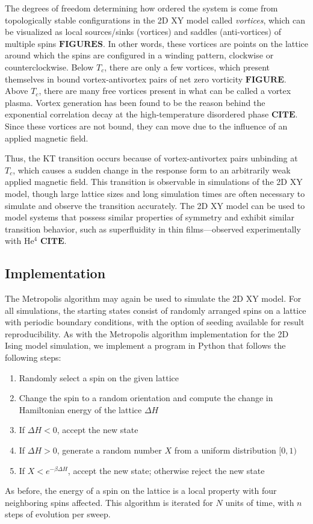 \documentclass[twocolumn,aps,prl]{revtex4-1} %
\begin{document}
The degrees of freedom determining how ordered the system is come from topologically stable configurations in the 2D XY model called \textit{vortices}, which can be visualized as local sources/sinks (vortices) and saddles (anti-vortices) of multiple spins $\textbf{FIGURES}$. In other words, these vortices are points on the lattice around which the spins are configured in a winding pattern, clockwise or counterclockwise. Below $T_c$, there are only a few vortices, which present themselves in bound vortex-antivortex pairs of net zero vorticity $\textbf{FIGURE}$. Above $T_c$, there are many free vortices present in what can be called a vortex plasma. Vortex generation has been found to be the reason behind the exponential correlation decay at the high-temperature disordered phase $\textbf{CITE}$. Since these vortices are not bound, they can move due to the influence of an applied magnetic field. 

Thus, the KT transition occurs because of vortex-antivortex pairs unbinding at $T_c$, which causes a sudden change in the response form to an arbitrarily weak applied magnetic field. This transition is observable in simulations of the 2D XY model, though large lattice sizes and long simulation times are often necessary to simulate and observe the transition accurately. The 2D XY model can be used to model systems that possess similar properties of symmetry and exhibit similar transition behavior, such as superfluidity in thin films---observed experimentally with He$^4$ $\textbf{CITE}$.

\subsection{Implementation}
The Metropolis algorithm may again be used to simulate the 2D XY model. For all simulations, the starting states consist of randomly arranged spins on a lattice with periodic boundary conditions, with the option of seeding available for result reproducibility. As with the Metropolis algorithm implementation for the 2D Ising model simulation, we implement a program in Python that follows the following steps:
\begin{enumerate}
	\item Randomly select a spin on the given lattice
	\item Change the spin to a random orientation and compute the change in Hamiltonian energy of the lattice $\Delta H$
	\item If $\Delta H < 0$, accept the new state
	\item If $\Delta H > 0$, generate a random number $X$ from a uniform distribution $[0,1)$
	\item If $X < e^{-\beta \Delta H}$, accept the new state; otherwise reject the new state
\end{enumerate}
As before, the energy of a spin on the lattice is a local property with four neighboring spins affected. This algorithm is iterated for $N$ units of time, with $n$ steps of evolution per sweep.
\end{document}
